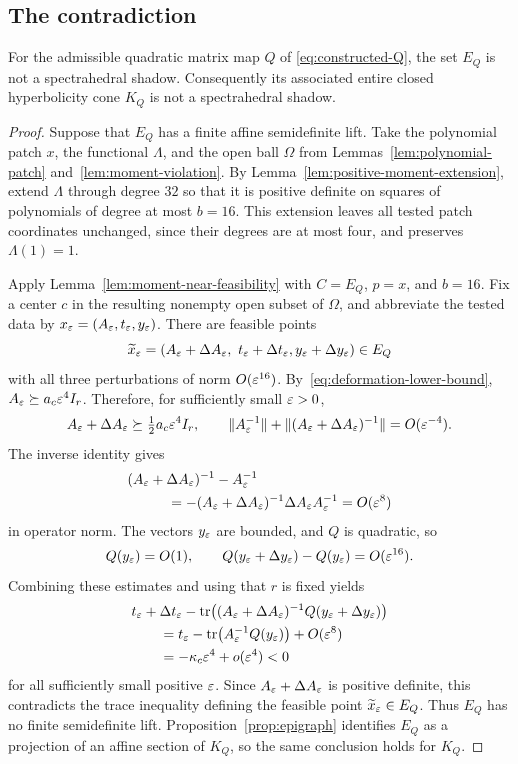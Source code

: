 \subsection{The contradiction}

\begin{theorem}
 \label{prop:no-lift}
For the admissible quadratic matrix map $Q$ of
\eqref{eq:constructed-Q}, the set $E_Q$ is not a spectrahedral shadow.
Consequently its associated entire closed hyperbolicity cone $K_Q$ is not
a spectrahedral shadow.
\end{theorem}

\begin{proof}
Suppose that $E_Q$ has a finite affine semidefinite lift.  Take the
polynomial patch $x$, the functional $\Lambda$, and the open ball
$\Omega$ from Lemmas~\ref{lem:polynomial-patch}
and~\ref{lem:moment-violation}.  By
Lemma~\ref{lem:positive-moment-extension}, extend $\Lambda$ through
degree $32$ so that it is positive definite on squares of polynomials of
degree at most $b=16$.  This extension leaves all tested patch coordinates
unchanged, since their degrees are at most four, and preserves
$\Lambda(1)=1$.

Apply Lemma~\ref{lem:moment-near-feasibility} with $C=E_Q$, $p=x$,
and $b=16$.  Fix a center $c$ in the resulting nonempty open subset of
$\Omega$, and abbreviate the tested data by
$x_\varepsilon=(A_\varepsilon,t_\varepsilon,y_\varepsilon)$.  There are feasible points
\[
 \widetilde x_\varepsilon
 =(A_\varepsilon+\Delta A_\varepsilon,\ t_\varepsilon+\Delta t_\varepsilon,
                         y_\varepsilon+\Delta y_\varepsilon)\in E_Q
\]
with all three perturbations of norm $O(\varepsilon^{16})$.
By~\eqref{eq:deformation-lower-bound},
$A_\varepsilon\succeq a_c\varepsilon^4 I_r$.  Therefore, for sufficiently small
$\varepsilon>0$,
\[
 A_\varepsilon+\Delta A_\varepsilon\succeq\tfrac12a_c\varepsilon^4 I_r,
 \qquad
 \|A_\varepsilon^{-1}\|+
 \|(A_\varepsilon+\Delta A_\varepsilon)^{-1}\|=O(\varepsilon^{-4}).
\]
The inverse identity gives
\begin{align*}
 &(A_\varepsilon+\Delta A_\varepsilon)^{-1}-A_\varepsilon^{-1}\\
 &\hspace{1cm}=-(A_\varepsilon+\Delta A_\varepsilon)^{-1}
          \Delta A_\varepsilon A_\varepsilon^{-1}=O(\varepsilon^8)
\end{align*}
in operator norm.  The vectors $y_\varepsilon$ are bounded, and $Q$ is
quadratic, so
\[
 Q(y_\varepsilon)=O(1),\qquad
 Q(y_\varepsilon+\Delta y_\varepsilon)-Q(y_\varepsilon)=O(\varepsilon^{16}).
\]
Combining these estimates and using that $r$ is fixed yields
\begin{align*}
 &t_\varepsilon+\Delta t_\varepsilon
  -\operatorname{tr}\bigl((A_\varepsilon+\Delta A_\varepsilon)^{-1}
                         Q(y_\varepsilon+\Delta y_\varepsilon)\bigr)\\
 &\qquad=t_\varepsilon-\operatorname{tr}\bigl(A_\varepsilon^{-1}Q(y_\varepsilon)\bigr)
                +O(\varepsilon^8)\\
 &\qquad=-\kappa_c\varepsilon^4+o(\varepsilon^4)<0
\end{align*}
for all sufficiently small positive $\varepsilon$.  Since
$A_\varepsilon+\Delta A_\varepsilon$ is positive definite, this contradicts the
trace inequality defining the feasible point $\widetilde x_\varepsilon\in E_Q$.
Thus $E_Q$ has no finite semidefinite lift.  Proposition~\ref{prop:epigraph}
identifies $E_Q$ as a projection of an affine section of $K_Q$, so the
same conclusion holds for $K_Q$.
\end{proof}

